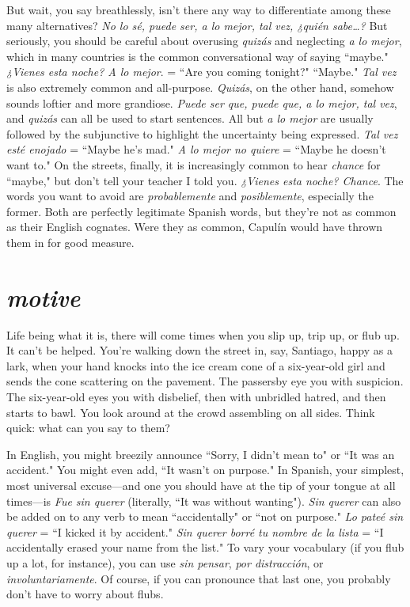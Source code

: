 But wait, you say breathlessly, isn't there any way to differentiate among these many alternatives? \emph{No lo sé, puede ser, a lo mejor, tal vez, ¿quién
	sabe\ldots{}?}
But seriously, you should be careful about
overusing \emph{quizás} and neglecting \emph{a lo mejor}, which in many countries
is the common conversational way of saying ``maybe." \emph{¿Vienes esta
	noche? A lo mejor}. = ``Are you coming tonight?" ``Maybe." \emph{Tal vez} is
also extremely common and all-purpose. \emph{Quizás}, on the other hand,
somehow sounds loftier and more grandiose. \emph{Puede ser que, puede
	que, a lo mejor, tal vez}, and \emph{quizás} can all be used to start sentences.
All but \emph{a lo mejor} are usually followed by the subjunctive to highlight
the uncertainty being expressed. \emph{Tal vez esté enojado} = ``Maybe he's
mad." \emph{A lo mejor no quiere} = ``Maybe he doesn't want to." On the
streets, finally, it is increasingly common to hear \emph{chance} for ``maybe,"
but don't tell your teacher I told you. \emph{¿Vienes esta noche? Chance}. The
words you want to avoid are \emph{probablemente} and \emph{posiblemente}, especially the former. Both are perfectly legitimate Spanish words, but
they're not as common as their English cognates. Were they as common, Capulín would have thrown them in for good measure.

\section{\emph{motive}}

Life being what it is, there will come times when you slip up,
trip up, or flub up. It can't be helped. You're walking down the street
in, say, Santiago, happy as a lark, when your hand knocks into the ice
cream cone of a six-year-old girl and sends the cone scattering on the
pavement. The passersby eye you with suspicion. The six-year-old eyes
you with disbelief, then with unbridled hatred, and then starts to bawl.
You look around at the crowd assembling on all sides. Think quick:
what can you say to them?

In English, you might breezily announce ``Sorry, I didn't mean
to" or ``It was an accident." You might even add, ``It wasn't on purpose." In Spanish, your simplest, most universal excuse---and one you
should have at the tip of your tongue at all times---is \emph{Fue sin querer}
(literally, ``It was without wanting"). \emph{Sin querer} can also be added on
to any verb to mean ``accidentally" or ``not on purpose." \emph{Lo pateé sin
	querer} = ``I kicked it by accident." \emph{Sin querer borré tu nombre de la
	lista} = ``I accidentally erased your name from the list." To vary your
vocabulary (if you flub up a lot, for instance), you can use \emph{sin pensar},
\emph{por distracción}, or \emph{involuntariamente}. Of course, if you can pronounce
that last one, you probably don't have to worry about flubs.

